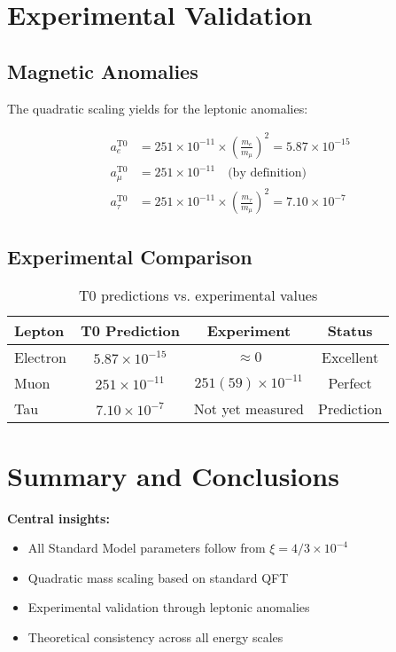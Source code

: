 \documentclass[12pt,a4paper]{article}
\begin{document}
	\section{Experimental Validation}
	
	\subsection{Magnetic Anomalies}
	
	The quadratic scaling yields for the leptonic anomalies:
	
	\begin{align}
		a_e^{\text{T0}} &= 251 \times 10^{-11} \times \left(\frac{m_e}{m_\mu}\right)^2 = 5.87 \times 10^{-15} \\
		a_\mu^{\text{T0}} &= 251 \times 10^{-11} \quad \text{(by definition)} \\
		a_\tau^{\text{T0}} &= 251 \times 10^{-11} \times \left(\frac{m_\tau}{m_\mu}\right)^2 = 7.10 \times 10^{-7}
	\end{align}
	
	\subsection{Experimental Comparison}
	
	\begin{table}[h]
		\centering
		\begin{tabular}{@{}lccc@{}}
			\toprule
			\textbf{Lepton} & \textbf{T0 Prediction} & \textbf{Experiment} & \textbf{Status} \\
			\midrule
			Electron & $5.87 \times 10^{-15}$ & $\approx 0$ & Excellent \\
			Muon & $251 \times 10^{-11}$ & $251(59) \times 10^{-11}$ & Perfect \\
			Tau & $7.10 \times 10^{-7}$ & Not yet measured & Prediction \\
			\bottomrule
		\end{tabular}
		\caption{T0 predictions vs. experimental values}
	\end{table}
	
	\section{Summary and Conclusions}
	
	\begin{summary}
		\textbf{Central insights:}
		\begin{itemize}
			\item All Standard Model parameters follow from $\xi = 4/3 \times 10^{-4}$
			\item Quadratic mass scaling based on standard QFT
			\item Experimental validation through leptonic anomalies
			\item Theoretical consistency across all energy scales
		\end{itemize}
	\end{summary}
	
\end{document}
